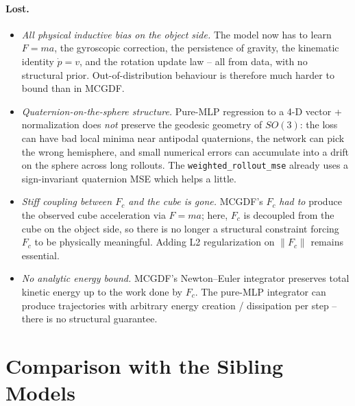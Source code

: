\documentclass[11pt]{article}
\begin{document}
\paragraph{Lost.}
\begin{itemize}
  \item \emph{All physical inductive bias on the object side.}  The
    model now has to learn $F = m a$, the gyroscopic correction, the
    persistence of gravity, the kinematic identity
    $\dot p = v$, and the rotation update law -- all from data, with
    no structural prior.  Out-of-distribution behaviour is therefore
    much harder to bound than in MCGDF.
  \item \emph{Quaternion-on-the-sphere structure.}  Pure-MLP
    regression to a 4-D vector + normalization does \emph{not}
    preserve the geodesic geometry of \(SO(3)\): the loss can have
    bad local minima near antipodal quaternions, the network can
    pick the wrong hemisphere, and small numerical errors can
    accumulate into a drift on the sphere across long rollouts.  The
    \texttt{weighted\_rollout\_mse} already uses a sign-invariant
    quaternion MSE which helps a little.
  \item \emph{Stiff coupling between $F_c$ and the cube is gone.}
    MCGDF's $F_c$ \emph{had to} produce the observed cube
    acceleration via $F = m a$; here, $F_c$ is decoupled from the
    cube on the object side, so there is no longer a structural
    constraint forcing $F_c$ to be physically meaningful.  Adding
    L2 regularization on $\|F_c\|$ remains essential.
  \item \emph{No analytic energy bound.}  MCGDF's Newton--Euler
    integrator preserves total kinetic energy up to the work done by
    $F_c$.  The pure-MLP integrator can produce trajectories with
    arbitrary energy creation / dissipation per step -- there is no
    structural guarantee.
\end{itemize}

\section{Comparison with the Sibling Models}
\end{document}
